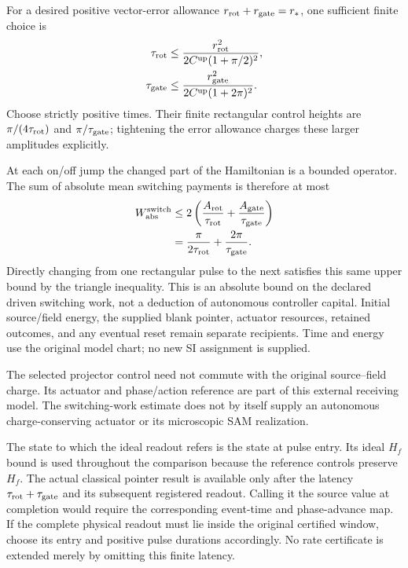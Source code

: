 For a desired positive vector-error allowance
$r_{\rm rot}+r_{\rm gate}=r_*$, one sufficient finite choice is
\begin{equation}
 \begin{aligned}
 \tau_{\rm rot}
   &\leq\frac{r_{\rm rot}^2}
       {2C^{\rm up}(1+\pi/2)^2},\\
 \tau_{\rm gate}
   &\leq\frac{r_{\rm gate}^2}
       {2C^{\rm up}(1+2\pi)^2}.
 \end{aligned}
 \label{eq:chvisd-sufficient-finite-pulse-times}
\end{equation}
Choose strictly positive times. Their finite rectangular control heights
are $\pi/(4\tau_{\rm rot})$ and $\pi/\tau_{\rm gate}$; tightening the
error allowance charges these larger amplitudes explicitly.

At each on/off jump the changed part of the Hamiltonian is a bounded
operator. The sum of absolute mean switching payments is therefore at
most
\begin{equation}
 \begin{aligned}
 W_{\rm abs}^{\rm switch}
  &\leq2\left(\frac{A_{\rm rot}}{\tau_{\rm rot}}
                     +\frac{A_{\rm gate}}{\tau_{\rm gate}}\right)\\
  &=\frac{\pi}{2\tau_{\rm rot}}
                     +\frac{2\pi}{\tau_{\rm gate}}.
 \end{aligned}
 \label{eq:chvisd-finite-readout-switch-work}
\end{equation}
Directly changing from one rectangular pulse to the next satisfies this
same upper bound by the triangle inequality. This is an absolute bound
on the declared driven switching work, not a deduction of autonomous
controller capital. Initial source/field energy, the supplied blank
pointer, actuator resources, retained outcomes, and any eventual reset
remain separate recipients. Time and energy use the original model
chart; no new SI assignment is supplied.

The selected projector control need not commute with the original
source--field charge. Its actuator and phase/action reference are part
of this external receiving model. The switching-work estimate does not
by itself supply an autonomous charge-conserving actuator or its
microscopic SAM realization.

The state to which the ideal readout refers is the state at pulse entry.
Its ideal $H_f$ bound is used throughout the comparison because the
reference controls preserve $H_f$. The actual classical pointer result
is available only after the latency
$\tau_{\rm rot}+\tau_{\rm gate}$ and its subsequent registered readout.
Calling it the source value at completion would require the corresponding
event-time and phase-advance map. If the complete physical readout must
lie inside the original certified window, choose its entry and positive
pulse durations accordingly. No rate certificate is extended merely by
omitting this finite latency.


